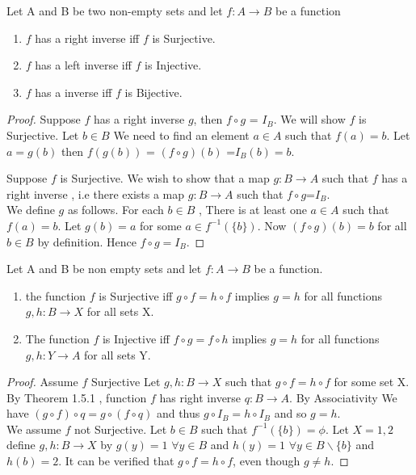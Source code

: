 \documentclass[a4paper,english,12pt]{article}   	%
\begin{document}
\begin{thm}
Let A and B be two non-empty sets and let $f \colon A \to B$ be a function
\begin{enumerate}
\item $f$ has a right inverse iff $f$ is Surjective.
\item $f$ has a left inverse iff $f$ is Injective.
\item $f$ has a inverse iff $f$ is Bijective.
\end{enumerate}
\end{thm}
\begin{proof} Suppose $f$ has a right inverse $g$, then 
$f \circ g$ = $I_{B}$. We will show $f$ is Surjective.
Let $b \in B$ We need to find an element $a \in A $ such that $f(a)=b$. Let $a=g(b)$ then $f(g(b))$ = $(f \circ g)(b)$ =$I_{B}(b)=b$.
\par
Suppose $f$ is Surjective. We wish to show that a map $g \colon B \to A$ such that $f$ has a right inverse , i.e there exists a map
$g \colon B \to A$ such that $f \circ g$=$I_{B}$.\\
We define $g$ as follows. For each $b \in B$ , There is at least one $a \in A$ such that $f(a)=b$. Let $g(b)=a$ for some $a \in f^{-1}(\{b\})$.
Now $(f \circ g)(b)=b$ for all $b \in B$ by definition. Hence $f \circ g = I_{B}$.

\end{proof} 
\begin{thm} Let A and B be non empty sets and let $f \colon A \to B$ be a function.
\begin{enumerate}
\item the function $f$ is Surjective iff $g \circ f = h \circ f$ implies $g=h$ for all functions $g,h \colon B \to X$ for all sets X.
\item The function $f$ is Injective iff $f \circ g = f \circ h$ implies $g=h$ for all functions $g,h \colon Y \to A$ for all sets Y.
\end{enumerate}
\begin{proof}
Assume $f$ Surjective Let $g,h \colon B \to X$ such that $g \circ f = h \circ f$ for some set X. By Theorem 1.5.1 , function $f$ has right inverse $q \colon B \to A$. By Associativity We have $(g \circ f) \circ q = g \circ (f \circ q) $ and thus $g \circ I_{B} = h \circ I_{B}$ and so $g=h$.\\
We assume $f$ not Surjective. Let $b \in B$ such that $f^{-1}(\{b\})= \phi$. Let $X={1,2}$ define $g,h \colon B \to X$ by $g(y)=1$ $\forall y \in B$ and $h(y)=1$ $ \forall y \in B \backslash \{b\}$ and $h(b)=2$. It can be verified that $g \circ f = h \circ f$, even though $g \neq h$.
\end{proof}
\end{thm}
\end{document}
